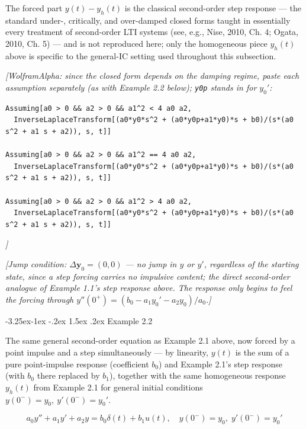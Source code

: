 \documentclass[
  11pt,
]{article}
\makeatletter
\renewcommand\paragraph{\@startsection{paragraph}{4}{\z@}%
                                     {-3.25ex\@plus -1ex \@minus -.2ex}%
                                     {1.5ex \@plus .2ex}%
                                     {\normalfont\normalsize\bfseries}}
\makeatother
\begin{document}
The forced part \(y(t) - y_h(t)\) is the classical second-order step
response --- the standard under-, critically, and over-damped closed
forms taught in essentially every treatment of second-order LTI systems
(see, e.g., Nise, 2010, Ch. 4; Ogata, 2010, Ch. 5) --- and is not
reproduced here; only the homogeneous piece \(y_h(t)\) above is specific
to the general-IC setting used throughout this subsection.

\emph{{[}WolframAlpha: since the closed form depends on the damping
regime, paste each assumption separately (as with Example 2.2 below);
\texttt{y0p} stands in for \(y_0'\):}

\begin{verbatim}
Assuming[a0 > 0 && a2 > 0 && a1^2 < 4 a0 a2,
  InverseLaplaceTransform[(a0*y0*s^2 + (a0*y0p+a1*y0)*s + b0)/(s*(a0 s^2 + a1 s + a2)), s, t]]

Assuming[a0 > 0 && a2 > 0 && a1^2 == 4 a0 a2,
  InverseLaplaceTransform[(a0*y0*s^2 + (a0*y0p+a1*y0)*s + b0)/(s*(a0 s^2 + a1 s + a2)), s, t]]

Assuming[a0 > 0 && a2 > 0 && a1^2 > 4 a0 a2,
  InverseLaplaceTransform[(a0*y0*s^2 + (a0*y0p+a1*y0)*s + b0)/(s*(a0 s^2 + a1 s + a2)), s, t]]
\end{verbatim}

\emph{{]}}

\emph{{[}Jump condition: \(\Delta\mathbf y_0=(0,0)\) --- no jump in
\(y\) or \(y'\), regardless of the starting state, since a step forcing
carries no impulsive content; the direct second-order analogue of
Example 1.1's step response above. The response only begins to feel the
forcing through \(y''(0^+) = (b_0 - a_1 y_0' - a_2 y_0)/a_0\).{]}}

\hypertarget{example-2.2}{%
\paragraph{Example 2.2}\label{example-2.2}}

The same general second-order equation as Example 2.1 above, now forced
by a point impulse and a step simultaneously --- by linearity, \(y(t)\)
is the sum of a pure point-impulse response (coefficient \(b_0\)) and
Example 2.1's step response (with \(b_0\) there replaced by \(b_1\)),
together with the same homogeneous response \(y_h(t)\) from Example 2.1
for general initial conditions \(y(0^-)=y_0,\ y'(0^-)=y_0'\).

\[
a_0 y'' + a_1 y' + a_2 y = b_0 \delta(t) + b_1 u(t), \quad y(0^-) = y_0, \; y'(0^-) = y_0'
\]
\end{document}
